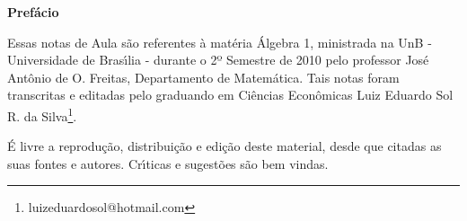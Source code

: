 \begin{center}
\Huge \textbf{Pref{\'a}cio}
\end{center}
\hspace{0,5cm}Essas notas de Aula s{\~a}o referentes {\`a} mat{\'e}ria {\'A}lgebra 1,
ministrada na UnB - Universidade de Bras{\'\i}lia - durante o 2º Semestre de 2010
pelo professor Jos{\'e} Ant{\^o}nio de O. Freitas, Departamento de Matem{\'a}tica. Tais
notas foram transcritas e editadas pelo graduando em Ci{\^e}ncias Econ{\^o}micas
Luiz Eduardo Sol R. da Silva\footnote{luizeduardosol@hotmail.com}.

{\'E} livre a reprodu{\c c}{\~a}o, distribui{\c c}{\~a}o e edi{\c c}{\~a}o deste material, desde que citadas as suas fontes e autores. Cr{\'\i}ticas e sugest{\~o}es s{\~a}o bem vindas.
\vspace{20cm}




